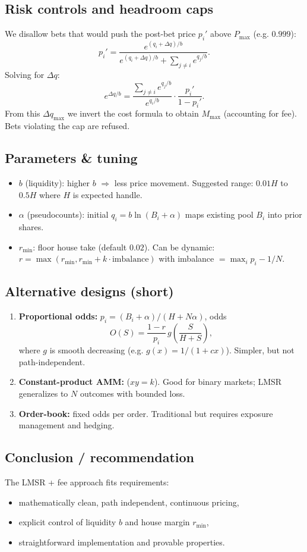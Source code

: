 \documentclass[]{article}
\begin{document}
\subsection*{Risk controls and headroom caps}
We disallow bets that would push the post-bet price $p_i'$ above $P_{\max}$ (e.g. $0.999$):
\[
p_i' = \frac{e^{(q_i + \Delta q)/b}}{e^{(q_i + \Delta q)/b} + \sum_{j\ne i} e^{q_j/b}}.
\]
Solving for $\Delta q$:
\[
e^{\Delta q / b} = \frac{\sum_{j\ne i} e^{q_j/b}}{e^{q_i/b}} \cdot \frac{p_i'}{1 - p_i'}.
\]
From this $\Delta q_{\max}$ we invert the cost formula to obtain $M_{\max}$ (accounting for fee). Bets violating the cap are refused.

\subsection*{Parameters \& tuning}
\begin{itemize}
  \item $b$ (liquidity): higher $b$ $\Rightarrow$ less price movement. Suggested range: $0.01H$ to $0.5H$ where $H$ is expected handle.
  \item $\alpha$ (pseudocounts): initial $q_i = b \ln(B_i + \alpha)$ maps existing pool $B_i$ into prior shares.
  \item $r_{\min}$: floor house take (default $0.02$). Can be dynamic: $r = \max(r_{\min}, r_{\min} + k \cdot \text{imbalance})$ with imbalance $= \max_i p_i - 1/N$.
\end{itemize}

\subsection*{Alternative designs (short)}
\begin{enumerate}
  \item \textbf{Proportional odds:} $p_i = (B_i + \alpha)/(H + N\alpha)$, odds
    \[
    O(S) = \frac{1-r}{p_i}\, g\!\left(\frac{S}{H+S}\right),
    \]
    where $g$ is smooth decreasing (e.g. $g(x) = 1/(1+cx)$). Simpler, but not path-independent.
  \item \textbf{Constant-product AMM:} ($xy=k$). Good for binary markets; LMSR generalizes to $N$ outcomes with bounded loss.
  \item \textbf{Order-book:} fixed odds per order. Traditional but requires exposure management and hedging.
\end{enumerate}

\subsection*{Conclusion / recommendation}
The LMSR + fee approach fits requirements:
\begin{itemize}
  \item mathematically clean, path independent, continuous pricing,
  \item explicit control of liquidity $b$ and house margin $r_{\min}$,
  \item straightforward implementation and provable properties.
\end{itemize}
\end{document}
